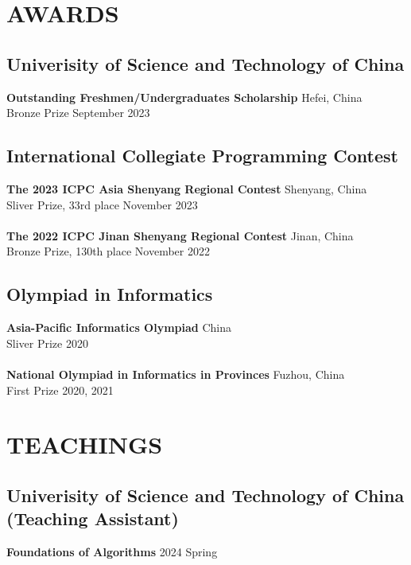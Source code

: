 \documentclass[a4paper,9pt]{extarticle}
\begin{document}
\section*{AWARDS}

\subsection*{Univerisity of Science and Technology of China}
\textbf{Outstanding Freshmen/Undergraduates Scholarship}  \hfill Hefei, China\\ 
Bronze Prize \hfill September 2023\\

\subsection*{International Collegiate Programming Contest}
\textbf{The 2023 ICPC Asia Shenyang Regional Contest}  \hfill Shenyang, China\\ 
Sliver Prize, 33rd place \hfill November 2023\\ \\
\textbf{The 2022 ICPC Jinan Shenyang Regional Contest}  \hfill Jinan, China\\ 
Bronze Prize, 130th place \hfill November 2022\\

\subsection*{Olympiad in Informatics}
\textbf{Asia-Pacific Informatics Olympiad}  \hfill China\\ 
Sliver Prize \hfill 2020\\ \\
\textbf{National Olympiad in Informatics in Provinces}  \hfill Fuzhou, China\\ 
First Prize \hfill 2020, 2021\\

\section*{TEACHINGS}
\subsection*{Univerisity of Science and Technology of China (Teaching Assistant)}
\textbf{Foundations of Algorithms}  \hfill 2024 Spring\\ %
\end{document}
